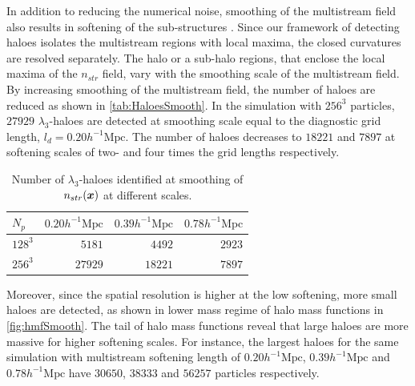 \documentclass[fleqn,usenatbib,useAMS]{mnras}
\begin{document}
{In addition to reducing the numerical noise, smoothing of the multistream field also results in softening of the sub-structures \cite{Ramachandra2017}. Since our framework of detecting haloes isolates the multistream regions with local maxima, the closed curvatures are resolved separately. The halo or a sub-halo regions, that enclose the local maxima of the $n_{str}$ field, vary with the smoothing scale of the multistream field. By increasing smoothing of the multistream field, the number of haloes are reduced as shown in \autoref{tab:HaloesSmooth}. In the simulation with $256^3$ particles, $27929$ $\lambda_3$-haloes are detected at smoothing scale equal to the diagnostic grid length, $l_d = 0.20 h^{-1} \text{Mpc}$. The number of haloes decreases to $18221$ and $7897$ at softening scales of two- and four times the grid lengths respectively. 

\begin{table}
  \caption{Number of $\lambda_3$-haloes identified at smoothing of $n_{str}(\bmath{x})$ at different scales.}
\begin{tabular}{|l|r|r|r|}
\hline
$N_p$  &  $0.20h^{-1} \text{Mpc}$ & $0.39 h^{-1} \text{Mpc}$ & $0.78 h^{-1} \text{Mpc}$ \\ \hline
$128^3$   & $5181$  &  $4492$ & $2923$ \\ \hline
$256^3$   & $27929$  & $18221$ & $7897$ \\ \hline

\end{tabular}
\label{tab:HaloesSmooth}
\end{table}


Moreover, since the spatial resolution is higher at the low softening, more small haloes are detected, as shown in lower mass regime of halo mass functions in \autoref{fig:hmfSmooth}. The tail of halo mass functions reveal that large haloes are more massive for higher softening scales. For instance, the largest haloes for the same simulation with multistream softening length of $0.20 h^{-1} \text{Mpc}$, $0.39 h^{-1} \text{Mpc}$ and $0.78 h^{-1} \text{Mpc}$ have $30650$, $38333$ and $56257$ particles respectively. 

}
\end{document}
